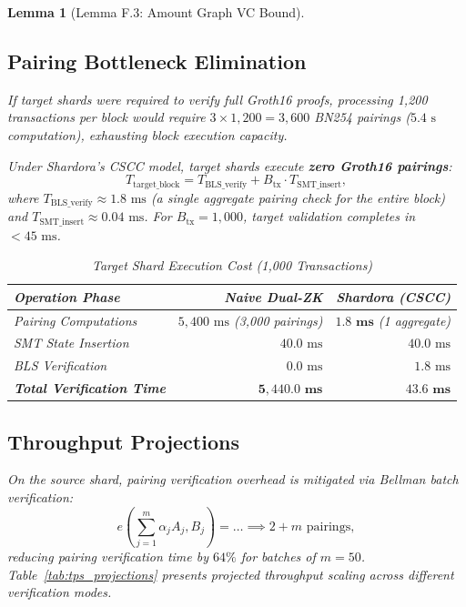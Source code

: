 \documentclass[journal,10pt,twocolumn]{IEEEtran}
\newtheorem{lemma}[theorem]{Lemma}
\theoremstyle{definition}
\theoremstyle{remark}
\begin{document}
\begin{lemma}[Lemma F.3: Amount Graph VC Bound]
\subsection{Pairing Bottleneck Elimination}
If target shards were required to verify full Groth16 proofs, processing 1,200 transactions per block would require $3 \times 1,200 = 3,600$ BN254 pairings ($5.4\text{ s}$ computation), exhausting block execution capacity.

Under Shardora's CSCC model, target shards execute \textbf{zero Groth16 pairings}:
\begin{equation}
T_{\text{target\_block}} = T_{\text{BLS\_verify}} + B_{\text{tx}} \cdot T_{\text{SMT\_insert}},
\end{equation}
where $T_{\text{BLS\_verify}} \approx 1.8\text{ ms}$ (a single aggregate pairing check for the entire block) and $T_{\text{SMT\_insert}} \approx 0.04\text{ ms}$. For $B_{\text{tx}} = 1,000$, target validation completes in $< 45\text{ ms}$.

\begin{table}[h]
\centering
\caption{Target Shard Execution Cost (1,000 Transactions)}
\label{tab:target_cost}
\begin{tabular}{lrr}
\toprule
\textbf{Operation Phase} & \textbf{Naive Dual-ZK} & \textbf{Shardora (CSCC)} \\
\midrule
Pairing Computations & $5,400\text{ ms}$ (3,000 pairings) & $\mathbf{1.8\text{ ms}}$ (1 aggregate) \\
SMT State Insertion & $40.0\text{ ms}$ & $40.0\text{ ms}$ \\
BLS Verification & $0.0\text{ ms}$ & $1.8\text{ ms}$ \\
\midrule
\textbf{Total Verification Time} & $\mathbf{5,440.0\text{ ms}}$ & $\mathbf{43.6\text{ ms}}$ \\
\bottomrule
\end{tabular}
\end{table}

\subsection{Throughput Projections}
On the source shard, pairing verification overhead is mitigated via Bellman batch verification:
\begin{equation}
e\left(\sum_{j=1}^m \alpha_j A_j, B_j\right) = \dots \implies 2 + m \text{ pairings},
\end{equation}
reducing pairing verification time by $64\%$ for batches of $m = 50$. Table~\ref{tab:tps_projections} presents projected throughput scaling across different verification modes.


\end{lemma}
\end{document}
